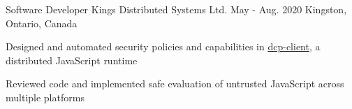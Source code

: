\begin{cventries}
  \cventry
    {Software Developer} %
    {Kings Distributed Systems Ltd.} %
    {May - Aug. 2020} %
    {Kingston, Ontario, Canada} %
    {
      \begin{cvitems} %
        \item{Designed and automated security policies and capabilities in \href{https://www.npmjs.com/package/dcp-client}{dcp-client}, a distributed JavaScript runtime}
        \item{Reviewed code and implemented safe evaluation of untrusted JavaScript across multiple platforms}
      \end{cvitems}
    }


\end{cventries}
